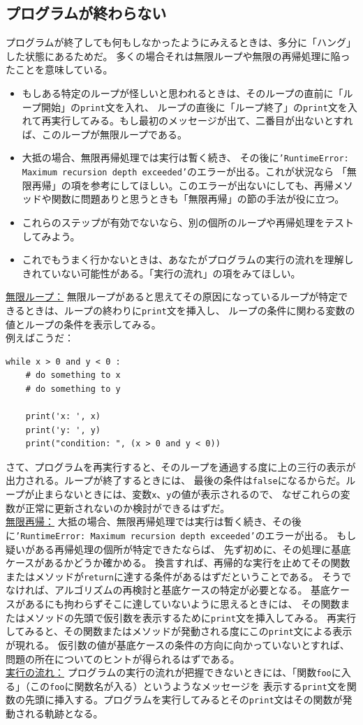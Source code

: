 \documentclass[a4j,12pt,makeidx]{jbook}
\begin{document}
\subsection*{プログラムが終わらない}
プログラムが終了しても何もしなかったようにみえるときは、多分に「ハング」した状態にあるためだ。
多くの場合それは無限ループや無限の再帰処理に陥ったことを意味している。
\begin{itemize}
\item もしある特定のループが怪しいと思われるときは、そのループの直前に「ループ開始」の{\tt print}文を入れ、
ループの直後に「ループ終了」の{\tt print}文を入れて再実行してみる。もし最初のメッセージが出て、二番目が出ないとすれば、このループが無限ループである。
\item 大抵の場合、無限再帰処理では実行は暫く続き、
その後に{\tt 'RuntimeError: Maximum recursion depth exceeded'}のエラーが出る。これが状況なら
「無限再帰」の項を参考にしてほしい。このエラーが出ないにしても、再帰メソッドや関数に問題ありと思うときも「無限再帰」の節の手法が役に立つ。
\item これらのステップが有効でないなら、別の個所のループや再帰処理をテストしてみよう。
\item これでもうまく行かないときは、あなたがプログラムの実行の流れを理解しきれていない可能性がある。「実行の流れ」の項をみてほしい。
\end{itemize}
\underline{無限ループ：}
無限ループがあると思えてその原因になっているループが特定できるときは、ループの終わりに{\tt print}文を挿入し、
ループの条件に関わる変数の値とループの条件を表示してみる。\\
例えばこうだ：
\begin{verbatim}
while x > 0 and y < 0 :
    # do something to x
    # do something to y

    print('x: ', x)
    print('y: ', y)
    print("condition: ", (x > 0 and y < 0))
\end{verbatim}
さて、プログラムを再実行すると、そのループを通過する度に上の三行の表示が出力される。ループが終了するときには、
最後の条件は{\tt false}になるからだ。ループが止まらないときには、変数{\tt x}、{\tt y}の値が表示されるので、
なぜこれらの変数が正常に更新されないのか検討ができるはずだ。\\
\underline{無限再帰：}
大抵の場合、無限再帰処理では実行は暫く続き、その後に{\tt 'RuntimeError: Maximum recursion depth exceeded'}のエラーが出る。
もし疑いがある再帰処理の個所が特定できたならば、
先ず初めに、その処理に基底ケースがあるかどうか確かめる。
換言すれば、再帰的な実行を止めてその関数またはメソッドが{\tt return}に達する条件があるはずだということである。
そうでなければ、アルゴリズムの再検討と基底ケースの特定が必要となる。
基底ケースがあるにも拘わらずそこに達していないように思えるときには、
その関数またはメソッドの先頭で仮引数を表示するために{\tt print}文を挿入してみる。
再実行してみると、その関数またはメソッドが発動される度にこの{\tt print}文による表示が現れる。
仮引数の値が基底ケースの条件の方向に向かっていないとすれば、問題の所在についてのヒントが得られるはずである。\\
\underline{実行の流れ：}
プログラムの実行の流れが把握できないときには、「関数{\tt foo}に入る」（この{\tt foo}に関数名が入る）というようなメッセージを
表示する{\tt print}文を関数の先頭に挿入する。プログラムを実行してみるとその{\tt print}文はその関数が発動される軌跡となる。
\end{document}
